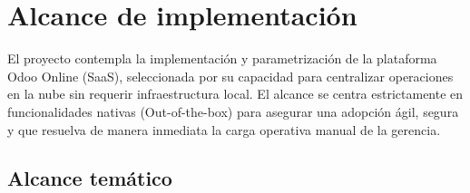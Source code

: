 \section{Alcance de implementación}
\begin{indentedsubsection}
El proyecto contempla la implementación y parametrización de la plataforma Odoo Online (SaaS), seleccionada por su capacidad para centralizar operaciones en la nube sin requerir infraestructura local. El alcance se centra estrictamente en funcionalidades nativas (Out-of-the-box) para asegurar una adopción ágil, segura y que resuelva de manera inmediata la carga operativa manual de la gerencia.
\end{indentedsubsection}

\subsection{Alcance temático}
